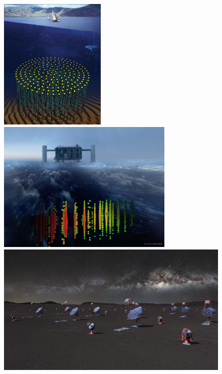 \documentclass[aspectratio=169]{beamer}
\begin{document}
\begin{frame}
\begin{columns}
        \includegraphics[height=0.18428\textwidth]{figures/telescopes/km3n.jpg}%
        \includegraphics[height=0.18428\textwidth]{figures/telescopes/icecube.jpg}%
        \includegraphics[height=0.18428\textwidth]{figures/telescopes/CTA.jpg}%
    \end{columns}
\end{frame}
\end{document}
